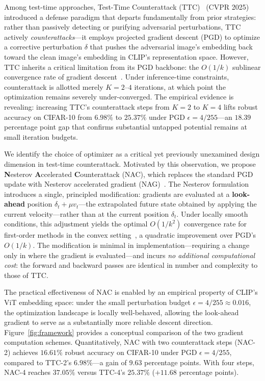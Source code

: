\documentclass[pdflatex,sn-basic,Numbered]{sn-jnl}
\theoremstyle{thmstyleone}
\theoremstyle{thmstyletwo}
\theoremstyle{thmstylethree}
\begin{document}
Among test-time approaches, Test-Time Counterattack (TTC)~\cite{xing2025clip} (CVPR 2025) introduced a defense paradigm that departs fundamentally from prior strategies: rather than passively detecting or purifying adversarial perturbations, TTC actively \emph{counterattacks}---it employs projected gradient descent (PGD) to optimize a corrective perturbation $\delta$ that pushes the adversarial image's embedding back toward the clean image's embedding in CLIP's representation space. However, TTC inherits a critical limitation from its PGD backbone: the $O(1/k)$ sublinear convergence rate of gradient descent~\cite{nesterov1983method}. Under inference-time constraints, counterattack is allotted merely $K=2$--$4$ iterations, at which point the optimization remains severely under-converged. The empirical evidence is revealing: increasing TTC's counterattack steps from $K=2$ to $K=4$ lifts robust accuracy on CIFAR-10 from $6.98\%$ to $25.37\%$ under PGD $\epsilon = 4/255$---an $18.39$ percentage point gap that confirms substantial untapped potential remains at small iteration budgets.

We identify the choice of optimizer as a critical yet previously unexamined design dimension in test-time counterattack. Motivated by this observation, we propose \textbf{N}esterov \textbf{A}ccelerated \textbf{C}ounterattack (NAC), which replaces the standard PGD update with Nesterov accelerated gradient (NAG)~\cite{nesterov1983method}. The Nesterov formulation introduces a single, principled modification: gradients are evaluated at a \textbf{look-ahead} position $\delta_t + \mu v_t$---the extrapolated future state obtained by applying the current velocity---rather than at the current position $\delta_t$. Under locally smooth conditions, this adjustment yields the optimal $O(1/k^2)$ convergence rate for first-order methods in the convex setting~\cite{nesterov1983method}, a quadratic improvement over PGD's $O(1/k)$. The modification is minimal in implementation---requiring a change only in where the gradient is evaluated---and incurs \emph{no additional computational cost}: the forward and backward passes are identical in number and complexity to those of TTC.

The practical effectiveness of NAC is enabled by an empirical property of CLIP's ViT embedding space: under the small perturbation budget $\epsilon = 4/255 \approx 0.016$, the optimization landscape is locally well-behaved, allowing the look-ahead gradient to serve as a substantially more reliable descent direction. Figure~\ref{fig:framework} provides a conceptual comparison of the two gradient computation schemes. Quantitatively, NAC with two counterattack steps (NAC-2) achieves $16.61\%$ robust accuracy on CIFAR-10 under PGD $\epsilon=4/255$, compared to TTC-2's $6.98\%$---a gain of $9.63$ percentage points. With four steps, NAC-4 reaches $37.05\%$ versus TTC-4's $25.37\%$ ($+11.68$ percentage points).
\end{document}

